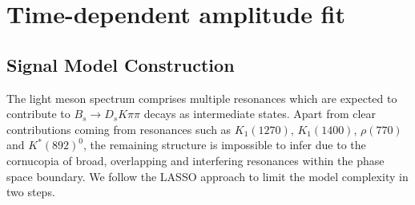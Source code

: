 \section{Time-dependent amplitude fit}
\label{sec:fullFit}

\subsection{Signal Model Construction}
\label{sec:LASSO}

The light meson spectrum comprises multiple resonances which are expected to contribute to $B_s \to D_s K \pi \pi$  decays as intermediate states. 
Apart from clear contributions coming from resonances such as $K_{1}(1270)$, $K_{1}(1400)$, $\rho(770)$ and $K^*(892)^0$, 
the remaining structure is impossible to infer due to
the cornucopia of broad, overlapping and interfering resonances 
within the phase space boundary.
We follow the \textsf{LASSO} \cite{Tibshirani94regressionshrinkage,Guegan:2015mea} approach 
to limit the model complexity in two steps.

